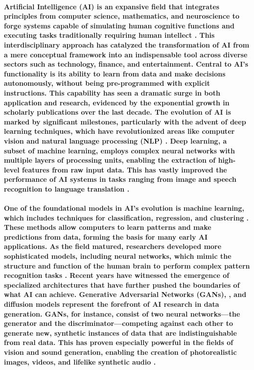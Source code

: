 \documentclass[11pt,a4paper,oneside]{report}
\begin{document}
\paragraph{Artificial Intelligence (AI) is an expansive field that integrates principles from computer science, mathematics, and neuroscience to forge systems capable of simulating human cognitive functions and executing tasks traditionally requiring human intellect \cite{russell2010artificial}. This interdisciplinary approach has catalyzed the transformation of AI from a mere conceptual framework into an indispensable tool across diverse sectors such as technology, finance, and entertainment. Central to AI's functionality is its ability to learn from data and make decisions autonomously, without being pre-programmed with explicit instructions. This capability has seen a dramatic surge in both application and research, evidenced by the exponential growth in scholarly publications over the last decade.
The evolution of AI is marked by significant milestones, particularly with the advent of deep learning techniques, which have revolutionized areas like computer vision and natural language processing (NLP) \cite{lecun2015deep}. Deep learning, a subset of machine learning, employs complex neural networks with multiple layers of processing units, enabling the extraction of high-level features from raw input data. This has vastly improved the performance of AI systems in tasks ranging from image and speech recognition to language translation \cite{goodfellow2016deep}.
}

\paragraph{One of the foundational models in AI's evolution is machine learning, which includes techniques for classification, regression, and clustering \cite{huang2022large}. These methods allow computers to learn patterns and make predictions from data, forming the basis for many early AI applications. As the field matured, researchers developed more sophisticated models, including neural networks, which mimic the structure and function of the human brain to perform complex pattern recognition tasks \cite{schmidhuber2015deep}.
Recent years have witnessed the emergence of specialized architectures that have further pushed the boundaries of what AI can achieve. Generative Adversarial Networks (GANs), \cite{goodfellow2014generative} \cite{vondrick2016generating} \cite{tulyakov2018mocogan} \cite{clark2019adversarial} \cite{brooks2022generating}, and diffusion models \cite{rombach2022high} \cite{ho2022imagen} \cite{blattmann2023align} \cite{gupta2023photorealistic} represent the forefront of AI research in data generation. GANs, for instance, consist of two neural networks—the generator and the discriminator—competing against each other to generate new, synthetic instances of data that are indistinguishable from real data. This has proven especially powerful in the fields of vision and sound generation, enabling the creation of photorealistic images, videos, and lifelike synthetic audio \cite{granot2022drop}.
}
\end{document}
